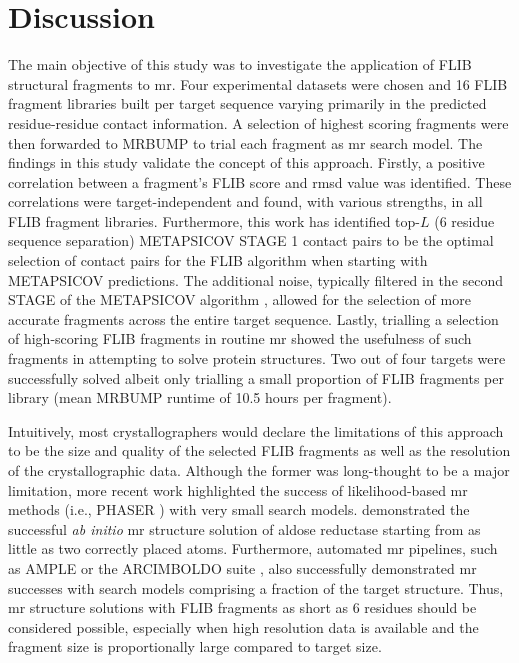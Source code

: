 \section{Discussion}
The main objective of this study was to investigate the application of FLIB structural fragments to \gls{mr}. Four experimental datasets were chosen and 16 FLIB fragment libraries built per target sequence varying primarily in the predicted residue-residue contact information. A selection of highest scoring fragments were then forwarded to MRBUMP to trial each fragment as \gls{mr} search model. The findings in this study validate the concept of this approach. Firstly, a positive correlation between a fragment's FLIB score and \gls{rmsd} value was identified. These correlations were target-independent and found, with various strengths, in all FLIB fragment libraries. Furthermore, this work has identified top-$L$ (6 residue sequence separation) METAPSICOV STAGE 1 contact pairs to be the optimal selection of contact pairs for the FLIB algorithm when starting with METAPSICOV predictions. The additional noise, typically filtered in the second STAGE of the METAPSICOV algorithm \cite{Jones2015-wp}, allowed for the selection of more accurate fragments across the entire target sequence. Lastly, trialling a selection of high-scoring FLIB fragments in routine \gls{mr} showed the usefulness of such fragments in attempting to solve protein structures. Two out of four targets were successfully solved albeit only trialling a small proportion of FLIB fragments per library (mean MRBUMP runtime of 10.5 hours per fragment).

Intuitively, most crystallographers would declare the limitations of this approach to be the size and quality of the selected FLIB fragments as well as the resolution of the crystallographic data. Although the former was long-thought to be a major limitation, more recent work highlighted the success of likelihood-based \gls{mr} methods (i.e., PHASER \cite{McCoy2007-bf}) with very small search models. \textcite{McCoy2017-wh} demonstrated the successful \textit{ab initio} \gls{mr} structure solution of aldose reductase starting from as little as two correctly placed atoms. Furthermore, automated \gls{mr} pipelines, such as AMPLE \cite{Bibby2012-vg} or the ARCIMBOLDO suite \cite{Millan2015-ih}, also successfully demonstrated \gls{mr} successes with search models comprising a fraction of the target structure. Thus, \gls{mr} structure solutions with FLIB fragments as short as 6 residues should be considered possible, especially when high resolution data is available and the fragment size is proportionally large compared to target size.

